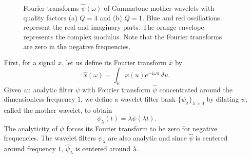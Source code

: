 \documentclass{article}
\newcommand{\la}{{\lambda}}
\begin{document}
\begin{sloppy}
\begin{figure}
\begin{center}
\caption{
\label{fig:gammatones}
Fourier transforms $\widehat{\psi}(\omega)$ of Gammatone mother wavelets with quality factors (a) $Q = 4$ and (b) $Q = 1$. Blue and red oscillations represent the real and imaginary parts. The orange envelope represents the complex modulus. Note that the Fourier transforms are zero in the negative frequencies.}
\end{center}
\end{figure}

First, for a signal $x$, let us define its Fourier transform $\widehat{x}$ by
\begin{equation}
	\widehat{x}(\omega) = \int_{\mathbb{R}} x(u) e^{-i\omega u}\,du.
\end{equation}
Given an analytic filter $\psi$ with Fourier transform $\widehat{\psi}$ concentrated around the dimensionless frequency $1$, we define a wavelet filter bank $\{\psi_\lambda\}_{\lambda>0}$ by dilating $\psi$, called the mother wavelet, to obtain
\begin{equation}
	\psi_\lambda(t) = \lambda \psi(\lambda t).
\end{equation}
The analyticity of $\psi$ forces its Fourier transform to be zero for negative frequencies. The wavelet filters $\psi_\lambda$ are also analytic and since $\widehat{\psi}$ is centered around frequency $1$, $\widehat{\psi}_\la$ is centered around $\lambda$.


\end{sloppy}
\end{document}
